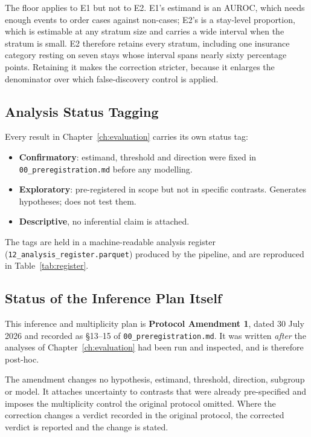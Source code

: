 The floor applies to E1 but not to E2. E1's estimand is an AUROC, which needs
enough events to order cases against non-cases; E2's is a stay-level
proportion, which is estimable at any stratum size and carries a wide interval
when the stratum is small. E2 therefore retains every stratum, including one
insurance category resting on seven stays whose interval spans nearly sixty
percentage points. Retaining it makes the correction stricter, because it
enlarges the denominator over which false-discovery control is applied.

\subsection{Analysis Status Tagging}

Every result in Chapter~\ref{ch:evaluation} carries its own status tag:

\begin{itemize}
    \item \textbf{Confirmatory}: estimand, threshold and direction were
          fixed in \texttt{00\_preregistration.md} before any modelling.
    \item \textbf{Exploratory}: pre-registered in scope but not in specific
          contrasts. Generates hypotheses; does not test them.
    \item \textbf{Descriptive}, no inferential claim is attached.
\end{itemize}

The tags are held in a machine-readable analysis register
(\texttt{12\_analysis\_\allowbreak register\allowbreak .parquet}) produced by
the pipeline, and are
reproduced in Table~\ref{tab:register}.

\subsection{Status of the Inference Plan Itself}

This inference and multiplicity plan is \textbf{Protocol Amendment 1}, dated
30 July 2026 and recorded as \S13--15 of
\texttt{00\_preregistration.md}. It was written \emph{after} the analyses of
Chapter~\ref{ch:evaluation} had been run and inspected, and is therefore
post-hoc.

The amendment changes no hypothesis, estimand, threshold, direction, subgroup
or model. It attaches uncertainty to contrasts that were already pre-specified
and imposes the multiplicity control the original protocol omitted. Where the
correction changes a verdict recorded in the original protocol, the corrected
verdict is reported and the change is stated.

